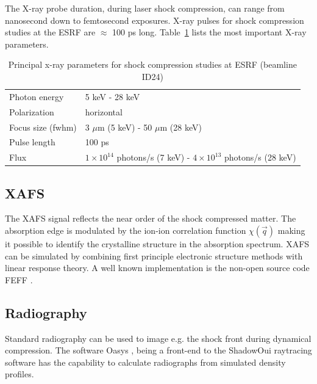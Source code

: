 \documentclass[10pt]{scrartcl}
\begin{document}
The X-ray probe duration, during laser shock compression, can range from nanosecond down to femtosecond exposures.
X-ray pulses for shock compression studies at the ESRF are $\approx$ 100 ps long. Table~\ref{tab:esrf_parameters} lists the most important X-ray parameters.

\begin{table}
  \centering
  \begin{tabular}{l|l}
    \hline
    \hline
    Photon energy & 5 keV - 28 keV \\
    Polarization & horizontal \\
    Focus size (fwhm) & 3 $\mu$m (5 keV) - 50 $\mu$m (28 keV)\\
    Pulse length & 100 ps\\
    Flux  & $1\times 10^{14}$ photons/s (7 keV) - $4\times 10^{13}$ photons/s (28 keV) \\
    \hline
    \hline
  \end{tabular}
  \caption{Principal x-ray parameters for shock compression studies at ESRF
  (beamline ID24)}
  \label{tab:esrf_parameters}
\end{table}

\subsection{XAFS}
The XAFS signal reflects the near order of the shock compressed matter. The absorption edge is modulated by the ion-ion correlation function
$\chi(\vec q)$ making it possible to identify the crystalline
structure in the absorption spectrum. XAFS can be simulated by combining first
principle electronic structure methods with linear response theory. A well known
implementation is the non-open source code FEFF \cite{Rehr2009}.

\subsection{Radiography}
Standard radiography can be used to image e.g. the shock front during dynamical
compression. The software Oasys \cite{Rio2014}, being a front-end to the ShadowOui raytracing
software has the capability to calculate radiographs from simulated density
profiles.
\end{document}
